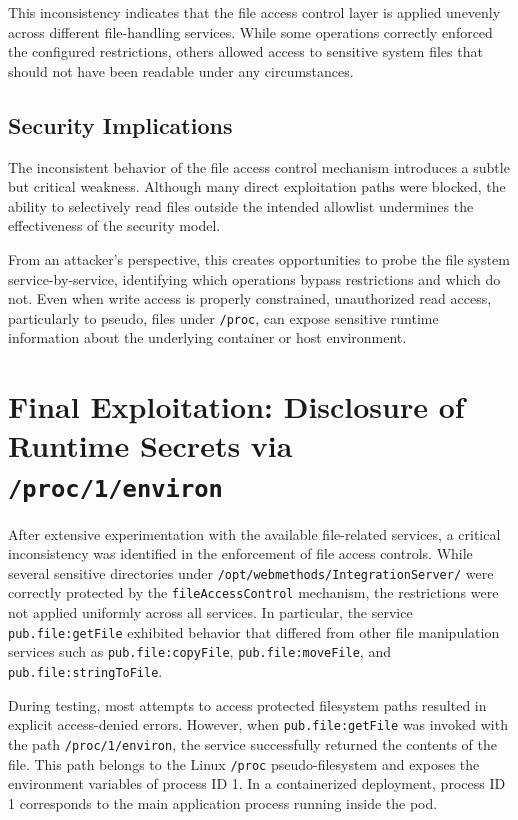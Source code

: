 \documentclass[12pt,a4paper]{report}
\begin{document}
This inconsistency indicates that the file access control layer is applied unevenly across different file-handling services. While some operations correctly enforced the configured restrictions, others allowed access to sensitive system files that should not have been readable under any circumstances.

\subsection{Security Implications}

The inconsistent behavior of the file access control mechanism introduces a subtle but critical weakness. Although many direct exploitation paths were blocked, the ability to selectively read files outside the intended allowlist undermines the effectiveness of the security model.

From an attacker’s perspective, this creates opportunities to probe the file system service-by-service, identifying which operations bypass restrictions and which do not. Even when write access is properly constrained, unauthorized read access, particularly to pseudo, files under \texttt{/proc}, can expose sensitive runtime information about the underlying container or host environment.

\clearpage
\section{Final Exploitation: Disclosure of Runtime Secrets via \texttt{/proc/1/environ}}

After extensive experimentation with the available file-related services, a critical inconsistency was identified in the enforcement of file access controls. While several sensitive directories under \texttt{/opt/webmethods/IntegrationServer/} were correctly protected by the \texttt{fileAccessControl} mechanism, the restrictions were not applied uniformly across all services. In particular, the service \texttt{pub.file:getFile} exhibited behavior that differed from other file manipulation services such as \texttt{pub.file:copyFile}, \texttt{pub.file:moveFile}, and \texttt{pub.file:stringToFile}.

During testing, most attempts to access protected filesystem paths resulted in explicit access-denied errors. However, when \texttt{pub.file:getFile} was invoked with the path \texttt{/proc/1/environ}, the service successfully returned the contents of the file. This path belongs to the Linux \texttt{/proc} pseudo-filesystem and exposes the environment variables of process ID 1. In a containerized deployment, process ID 1 corresponds to the main application process running inside the pod.
\end{document}
